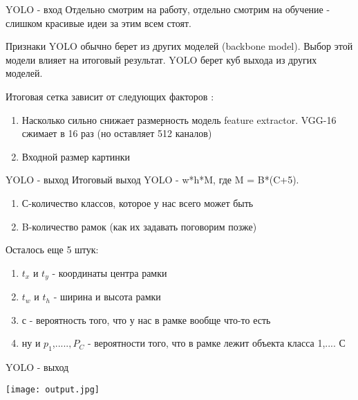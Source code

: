 \documentclass[notes,12pt, aspectratio=169]{beamer}
\begin{document}
\begin{frame}{YOLO - вход}
	Отдельно смотрим на работу, отдельно смотрим на обучение - слишком красивые идеи за этим всем стоят.
	
	Признаки YOLO обычно берет из других моделей (backbone model). Выбор этой модели влияет на итоговый результат. YOLO берет куб выхода из других моделей.
	
	Итоговая сетка зависит от следующих факторов :
	\begin{enumerate}
		\item Насколько сильно снижает размерность модель feature extractor. VGG-16 сжимает в 16 раз (но оставляет 512 каналов)
		\item Входной размер картинки
	\end{enumerate}
\end{frame}

\begin{frame}{YOLO - выход}
	Итоговый выход YOLO - w*h*M, где M = B*(C+5).
		\begin{enumerate}
		\item С-количество классов, которое у нас всего может быть
		\item B-количество рамок (как их задавать поговорим позже)
	\end{enumerate}
Осталось еще 5 штук:
\begin{enumerate}
	\item $t_x$ и $t_y$ - координаты центра рамки
	\item $t_w$ и $t_h$ - ширина и высота рамки
	\item $с$ - вероятность того, что у нас в рамке вообще что-то есть
	\item ну и $p_1$,.....$,P_C$ - вероятности того, что в рамке лежит объекта класса 1,.... С
\end{enumerate}
	
\end{frame}

\begin{frame}{YOLO - выход}
\begin{center}
	\texttt{[image: output.jpg]}
\end{center}
	
\end{frame}
\end{document}
